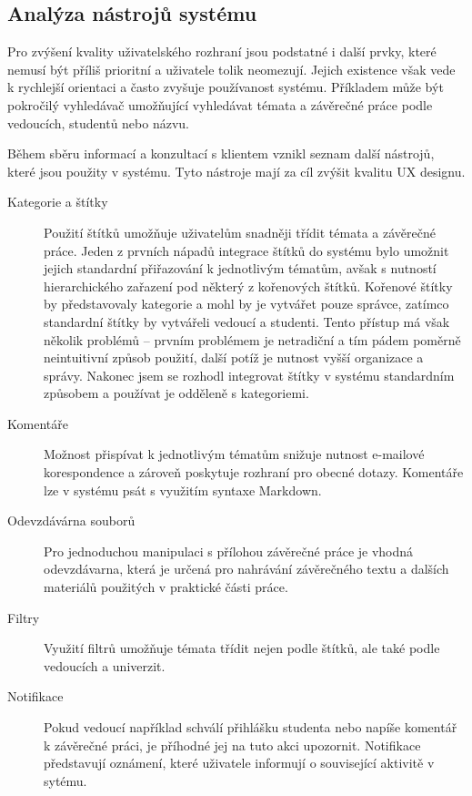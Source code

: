 \subsection{Analýza nástrojů systému}

Pro zvýšení kvality uživatelského rozhraní jsou podstatné i další prvky, které nemusí být příliš prioritní a uživatele tolik neomezují. Jejich existence však vede k rychlejší orientaci a často zvyšuje používanost systému. Příkladem může být pokročilý vyhledávač umožňující vyhledávat témata a závěrečné práce podle vedoucích, studentů nebo názvu.

Během sběru informací a konzultací s klientem vznikl seznam další nástrojů, které jsou použity v systému. Tyto nástroje mají za cíl zvýšit kvalitu UX designu.

\begin{description}
    \item[Kategorie a štítky] Použití štítků umožňuje uživatelům snadněji třídit témata a závěrečné práce. Jeden z prvních nápadů integrace štítků do systému bylo umožnit jejich standardní přiřazování k jednotlivým tématům, avšak s nutností hierarchického zařazení pod některý z kořenových štítků. Kořenové štítky by představovaly kategorie a mohl by je vytvářet pouze správce, zatímco standardní štítky by vytvářeli vedoucí a studenti. Tento přístup má však několik problémů -- prvním problémem je netradiční a tím pádem poměrně neintuitivní způsob použití, další potíž je nutnost vyšší organizace a správy. Nakonec jsem se rozhodl integrovat štítky v systému standardním způsobem a používat je odděleně s kategoriemi.
    \item[Komentáře] Možnost přispívat k jednotlivým tématům snižuje nutnost e-mailové korespondence a zároveň poskytuje rozhraní pro obecné dotazy. Komentáře lze v systému psát s využitím syntaxe Markdown.
    \item[Odevzdávárna souborů] Pro jednoduchou manipulaci s přílohou závěrečné práce je vhodná odevzdávarna, která je určená pro nahrávání závěrečného textu a dalších materiálů použitých v praktické části práce.
    \item[Filtry] Využití filtrů umožňuje témata třídit nejen podle štítků, ale také podle vedoucích a univerzit.
    \item[Notifikace] Pokud vedoucí například schválí přihlášku studenta nebo napíše komentář k závěrečné práci, je příhodné jej na tuto akci upozornit. Notifikace představují oznámení, které uživatele informují o související aktivitě v sytému.
\end{description}

